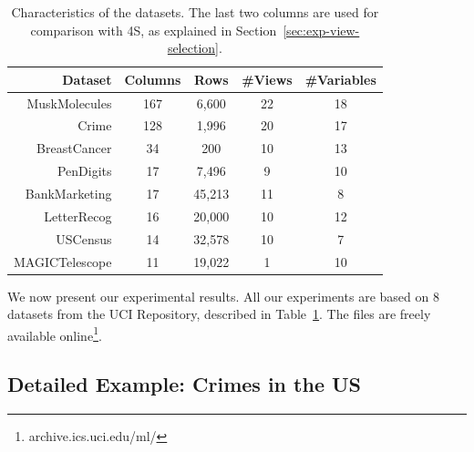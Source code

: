 \begin{table}
    \centering
    \small
    \begin{tabular}{r c c c c} 
        \hline
        Dataset & Columns & Rows & \#Views & \#Variables\\
        \hline
        MuskMolecules & 167 & 6,600 & 22 & 18\\
        Crime & 128 & 1,996 & 20 & 17\\
        BreastCancer & 34 & 200 & 10 & 13\\
        PenDigits & 17 & 7,496 & 9 & 10\\
        BankMarketing & 17 & 45,213 & 11& 8\\
        LetterRecog & 16 & 20,000 & 10 & 12\\
        USCensus & 14 & 32,578 & 10 & 7\\
        MAGICTelescope & 11 & 19,022 & 1 & 10\\
        \hline
    \end{tabular}
    \caption{Characteristics of the datasets. The last two columns are used for
    comparison with 4S, as explained in Section~\ref{sec:exp-view-selection}.}
    \label{tab:datasets}
\end{table}
We now present our experimental results. All our experiments are based on 8
datasets from the UCI Repository, described in Table~\ref{tab:datasets}. The
files are freely available online\footnote{archive.ics.uci.edu/ml/}.

\subsection{Detailed Example: Crimes in the US}

